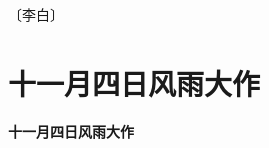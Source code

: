 \documentclass[12pt,UTF-8,openany,fontset=none]{ctexbook}
\begin{document}
\begin{center}
    \vspace{10pt}
    
    \begin{large}
        
        〔李白〕
        
    \end{large}
    
    \vspace{8pt}
    
    \begin{huge}
        
        \phantom{。}

        \phantom{。}
        
        \phantom{。}

        \phantom{。}
        
        \phantom{。}

        \phantom{。}
        
        \phantom{。}

        \phantom{。}
        
        \phantom{。}

        \phantom{。}
        
        \phantom{。}

        \phantom{。}
        
    \end{huge}
    
\end{center}

\vspace{8pt}
\clearpage


\section{十一月四日风雨大作}



\begin{center}
    {\bfseries 十一月四日风雨大作}
\end{center}
\end{document}
